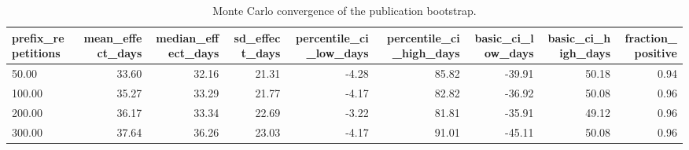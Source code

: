 \begin{table}[htbp]
\centering
\caption{Monte Carlo convergence of the publication bootstrap.}
\label{tab:bootstrap_convergence}
\small
\begin{tabular}{lrrrrrrrr}
\toprule
prefix\_repetitions & mean\_effect\_days & median\_effect\_days & sd\_effect\_days & percentile\_ci\_low\_days & percentile\_ci\_high\_days & basic\_ci\_low\_days & basic\_ci\_high\_days & fraction\_positive \\
\midrule
50.00 & 33.60 & 32.16 & 21.31 & -4.28 & 85.82 & -39.91 & 50.18 & 0.94 \\
100.00 & 35.27 & 33.29 & 21.77 & -4.17 & 82.82 & -36.92 & 50.08 & 0.96 \\
200.00 & 36.17 & 33.34 & 22.69 & -3.22 & 81.81 & -35.91 & 49.12 & 0.96 \\
300.00 & 37.64 & 36.26 & 23.03 & -4.17 & 91.01 & -45.11 & 50.08 & 0.96 \\
\bottomrule
\end{tabular}
\par\vspace{2pt}{\footnotesize Rows use the first B prespecified bootstrap repetitions; they are convergence diagnostics and do not define alternative inferential analyses.}
\end{table}
